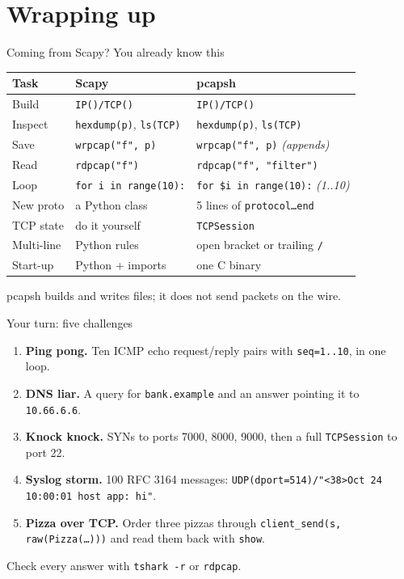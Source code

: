 \documentclass[aspectratio=169,11pt]{beamer}
\newcommand{\cmd}[1]{\texttt{\textcolor{wire}{#1}}}
\begin{document}
\section{Wrapping up}

\begin{frame}[fragile]{Coming from Scapy? You already know this}
\centering
\small
\begin{tabular}{@{}lll@{}}
\toprule
\textbf{Task} & \textbf{Scapy} & \textbf{pcapsh} \\
\midrule
Build      & \texttt{IP()/TCP()}           & \texttt{IP()/TCP()} \\
Inspect    & \texttt{hexdump(p)}, \texttt{ls(TCP)} & \texttt{hexdump(p)}, \texttt{ls(TCP)} \\
Save       & \texttt{wrpcap("f", p)}       & \texttt{wrpcap("f", p)} \textit{(appends)} \\
Read       & \texttt{rdpcap("f")}          & \texttt{rdpcap("f", "filter")} \\
Loop       & \texttt{for i in range(10):}  & \texttt{for \$i in range(10):} \textit{(1..10)} \\
New proto  & a Python class                & 5 lines of \texttt{protocol\ldots end} \\
TCP state  & do it yourself                & \texttt{TCPSession} \\
Multi-line & Python rules                  & open bracket or trailing \texttt{/} \\
Start-up   & Python + imports              & one C binary \\
\bottomrule
\end{tabular}

\bigskip
\raggedright
pcapsh builds and writes files; it does not send packets on the wire.
\end{frame}

\begin{frame}{Your turn: five challenges}
\begin{enumerate}
  \item[\faDice] \textbf{Ping pong.} Ten ICMP echo request/reply pairs with
        \texttt{seq=1..10}, in one loop.
  \item[\faGlobe] \textbf{DNS liar.} A query for \texttt{bank.example} and an
        answer pointing it to \texttt{10.66.6.6}.
  \item[\faDoorOpen] \textbf{Knock knock.} SYNs to ports 7000, 8000, 9000, then a
        full \texttt{TCPSession} to port 22.
  \item[\faMailBulk] \textbf{Syslog storm.} 100 RFC 3164 messages:
        \texttt{UDP(dport=514)/"<38>Oct 24 10:00:01 host app: hi"}.
  \item[\faPizzaSlice] \textbf{Pizza over TCP.} Order three pizzas through
        \texttt{client\_send(s, raw(Pizza(\ldots)))} and read them back with
        \cmd{show}.
\end{enumerate}
\bigskip
\centering
Check every answer with \texttt{tshark -r} or \cmd{rdpcap}.
\end{frame}
\end{document}
